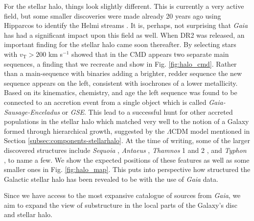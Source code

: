 For the stellar halo, things look slightly different. This is currently a very active field, but some smaller discoveries were made already 20 years ago using Hipparcos to identify the Helmi streams \citep{helmi:99}. It is, perhaps, not surprising that \textit{Gaia} has had a significant impact upon this field as well. When DR2 was released, an important finding for the stellar halo came soon thereafter. By selecting stars with $v_\mathrm{T} > 200$ km s$^{-1}$ \cite{dr2:hr} showed that in the CMD appears two separate main sequences, a finding that we recreate and show in Fig. \ref{fig:halo_cmd}. Rather than a main-sequence with binaries adding a brighter, redder sequence the new sequence appears on the left, consistent with isochrones of a lower metallicity. Based on its kinematics, chemistry, and age the left sequence was found to be connected to an accretion event from a single object \citep{belokurov:18, helmi:18} which is called \textit{Gaia-Sausage-Enceladus} or \textit{GSE}. This lead to a successful hunt for other accreted populations in the stellar halo which matched very well to the notion of a Galaxy formed through hierarchical growth, suggested by the $\Lambda$CDM model mentioned in Section \ref{subsec:components-stellarhalo}. At the time of writing, some of the larger discovered structures include \textit{Sequoia} \citep{myeong:19}, \textit{Antaeus} \citep{oria:22}, \textit{Thamnos} 1 and 2 \citep{koppelman:19}, and \textit{Typhon} \citep{tenachi:22}, to name a few. We show the expected positions of these features as well as some smaller ones in Fig. \ref{fig:halo_map}. This puts into perspective how structured the Galactic stellar halo has been revealed to be with the use of \textit{Gaia} data.

Since we have access to the most expansive catalogue of sources from \textit{Gaia}, we aim to expand the view of substructure in the local parts of the Galaxy's disc and stellar halo.


